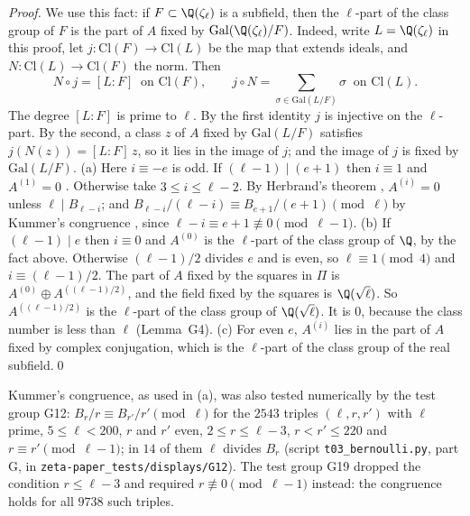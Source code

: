 \documentclass[11pt,letterpaper]{article}
\begin{document}
\emph{Proof.} We use this fact: if $F\subset\Q(\zeta_\ell)$ is a subfield, then the $\ell$-part of the class
group of $F$ is the part of $A$ fixed by $\mathrm{Gal}(\Q(\zeta_\ell)/F)$. Indeed, write
$L=\Q(\zeta_\ell)$ in this proof, let $j\colon\mathrm{Cl}(F)\to\mathrm{Cl}(L)$ be the map that extends
ideals, and $N\colon\mathrm{Cl}(L)\to\mathrm{Cl}(F)$ the norm. Then
\begin{equation}\label{D:345}
 N\circ j=[L:F]\ \text{ on }\mathrm{Cl}(F),\qquad j\circ N=\sum_{\sigma\in\mathrm{Gal}(L/F)}\sigma\ \text{ on }\mathrm{Cl}(L).
\end{equation}
The degree $[L:F]$ is prime to $\ell$. By the first identity $j$ is injective on the $\ell$-part. By the
second, a class $z$ of $A$ fixed by $\mathrm{Gal}(L/F)$ satisfies $j(N(z))=[L:F]\,z$, so it lies in the
image of $j$; and the image of $j$ is fixed by $\mathrm{Gal}(L/F)$.
(a) Here $i\equiv-e$ is odd. If $(\ell-1)\mid(e+1)$ then $i\equiv1$ and $A^{(1)}=0$
\cite[Prop.~6.16]{Was82}. Otherwise take $3\le i\le\ell-2$. By Herbrand's theorem \cite[Thm.~6.17]{Was82},
$A^{(i)}=0$ unless $\ell\mid B_{\ell-i}$; and $B_{\ell-i}/(\ell-i)\equiv B_{e+1}/(e+1)\pmod\ell$
by Kummer's congruence \cite[Cor.~5.14]{Was82}, since $\ell-i\equiv e+1\not\equiv0\pmod{\ell-1}$. (b) If
$(\ell-1)\mid e$ then $i\equiv0$ and
$A^{(0)}$ is the $\ell$-part of the class group of $\Q$, by the fact above. Otherwise $(\ell-1)/2$ divides
$e$ and is even, so $\ell\equiv1\pmod4$ and $i\equiv(\ell-1)/2$. The part of $A$ fixed by the squares in
$\Pi$ is $A^{(0)}\oplus A^{((\ell-1)/2)}$, and the field fixed by the squares is $\Q(\sqrt\ell)$. So
$A^{((\ell-1)/2)}$ is the $\ell$-part of the class group of $\Q(\sqrt\ell)$. It is $0$, because the class
number is less than $\ell$ (Lemma~G4). (c) For even $e$, $A^{(i)}$ lies in the part of $A$ fixed by complex
conjugation, which is the $\ell$-part of the class group of the real subfield.\qed

Kummer's congruence, as used in (a), was also tested numerically by the test group G12:
$B_r/r\equiv B_{r'}/r'\pmod\ell$ for the $2543$ triples $(\ell,r,r')$ with $\ell$ prime, $5\le\ell<200$,
$r$ and $r'$ even, $2\le r\le\ell-3$, $r<r'\le220$ and $r\equiv r'\pmod{\ell-1}$; in $14$ of them $\ell$
divides $B_r$ (script \texttt{t03\_bernoulli.py}, part G, in \texttt{zeta-paper\_tests/displays/G12}). The
test group G19 dropped the condition $r\le\ell-3$ and required $r\not\equiv0\pmod{\ell-1}$ instead: the
congruence holds for all $9738$ such triples.
\end{document}

